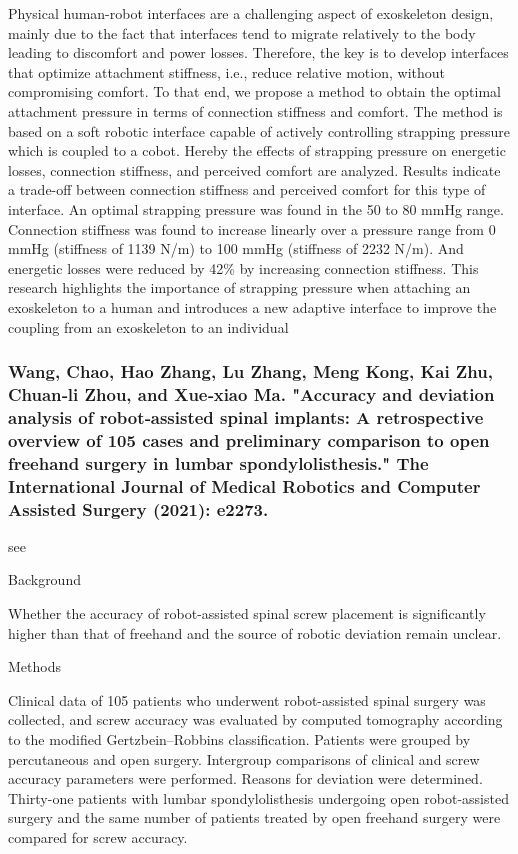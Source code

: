 \documentclass[conference]{IEEEtran}
\begin{document}
Physical human-robot interfaces are a challenging aspect of exoskeleton design, mainly due to the fact that interfaces tend to migrate relatively to the body leading to discomfort and power losses. Therefore, the key is to develop interfaces that optimize attachment stiffness, i.e., reduce relative motion, without compromising comfort. To that end, we propose a method to obtain the optimal attachment pressure in terms of connection stiffness and comfort. The method is based on a soft robotic interface capable of actively controlling strapping pressure which is coupled to a cobot. Hereby the effects of strapping pressure on energetic losses, connection stiffness, and perceived comfort are analyzed. Results indicate a trade-off between connection stiffness and perceived comfort for this type of interface. An optimal strapping pressure was found in the 50 to 80 mmHg range. Connection stiffness was found to increase linearly over a pressure range from 0 mmHg (stiffness of 1139 N/m) to 100 mmHg (stiffness of 2232 N/m). And energetic losses were reduced by 42\% by increasing connection stiffness. This research highlights the importance of strapping pressure when attaching an exoskeleton to a human and introduces a new adaptive interface to improve the coupling from an exoskeleton to an individual

\medskip
\subsubsection{Wang, Chao, Hao Zhang, Lu Zhang, Meng Kong, Kai Zhu, Chuan‐li Zhou, and Xue‐xiao Ma. "Accuracy and deviation analysis of robot‐assisted spinal implants: A retrospective overview of 105 cases and preliminary comparison to open freehand surgery in lumbar spondylolisthesis." The International Journal of Medical Robotics and Computer Assisted Surgery (2021): e2273.}
see \cite{wang2021accuracy}

Background

Whether the accuracy of robot-assisted spinal screw placement is significantly higher than that of freehand and the source of robotic deviation remain unclear.

Methods

Clinical data of 105 patients who underwent robot-assisted spinal surgery was collected, and screw accuracy was evaluated by computed tomography according to the modified Gertzbein–Robbins classification. Patients were grouped by percutaneous and open surgery. Intergroup comparisons of clinical and screw accuracy parameters were performed. Reasons for deviation were determined. Thirty-one patients with lumbar spondylolisthesis undergoing open robot-assisted surgery and the same number of patients treated by open freehand surgery were compared for screw accuracy.
\end{document}

